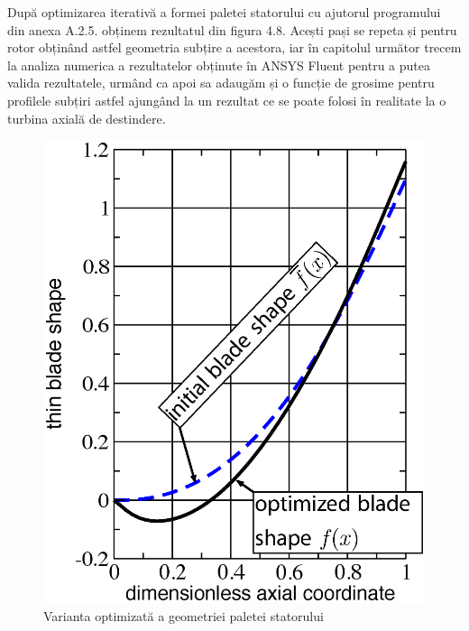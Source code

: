 După optimizarea iterativă a formei paletei statorului cu ajutorul programului din anexa A.2.5. obținem rezultatul din figura 4.8. Acești pași se repeta și pentru rotor obținând astfel geometria subțire a acestora, iar în capitolul următor trecem la analiza numerica a rezultatelor obținute în ANSYS Fluent pentru a putea valida rezultatele, urmând ca apoi sa adaugăm și o funcție de grosime pentru profilele subțiri astfel ajungând la un rezultat ce se poate folosi în realitate la o turbina axială de destindere.

\begin{figure}[t]
	\centering
	\includegraphics[scale=0.4]{figures/stator_optimized_blade.eps}
	\caption{Varianta optimizată a geometriei paletei statorului}
	\label{Varianta optimizată a geometriei paletei statorului}
\end{figure}

\clearpage
